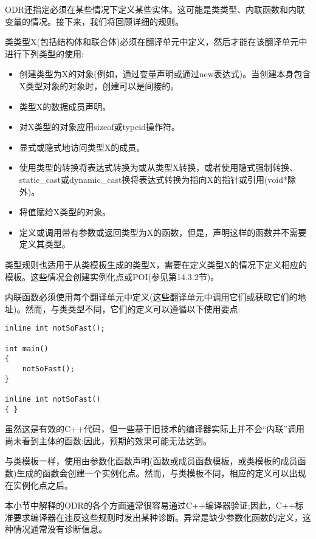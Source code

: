 ODR还指定必须在某些情况下定义某些实体。这可能是类类型、内联函数和内联变量的情况。接下来，我们将回顾详细的规则。

类类型X(包括结构体和联合体)必须在翻译单元中定义，然后才能在该翻译单元中进行下列类型的使用:

\begin{itemize}
\item 
创建类型为X的对象(例如，通过变量声明或通过new表达式)。当创建本身包含X类型对象的对象时，创建可以是间接的。

\item 
类型X的数据成员声明。

\item 
对X类型的对象应用sizeof或typeid操作符。

\item 
显式或隐式地访问类型X的成员。

\item 
使用类型的转换将表达式转换为或从类型X转换，或者使用隐式强制转换、static\_cast或dynamic\_cast换将表达式转换为指向X的指针或引用(void*除外)。

\item 
将值赋给X类型的对象。

\item 
定义或调用带有参数或返回类型为X的函数，但是，声明这样的函数并不需要定义其类型。
\end{itemize}

类型规则也适用于从类模板生成的类型X，需要在定义类型X的情况下定义相应的模板。这些情况会创建实例化点或POI(参见第14.3.2节)。

内联函数必须使用每个翻译单元中定义(这些翻译单元中调用它们或获取它们的地址)。然而，与类类型不同，它们的定义可以遵循以下使用要点:

\begin{lstlisting}[style=styleCXX]
inline int notSoFast();

int main()
{
	notSoFast();
}

inline int notSoFast()
{ }
\end{lstlisting}

虽然这是有效的C++代码，但一些基于旧技术的编译器实际上并不会“内联”调用尚未看到主体的函数;因此，预期的效果可能无法达到。

与类模板一样，使用由参数化函数声明(函数或成员函数模板，或类模板的成员函数)生成的函数会创建一个实例化点。然而，与类模板不同，相应的定义可以出现在实例化点之后。

本小节中解释的ODR的各个方面通常很容易通过C++编译器验证;因此，C++标准要求编译器在违反这些规则时发出某种诊断。异常是缺少参数化函数的定义，这种情况通常没有诊断信息。

